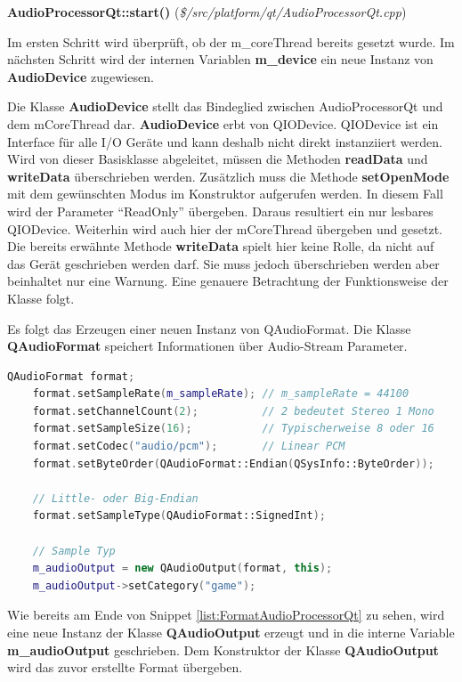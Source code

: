 \documentclass[11pt,a4paper]{scrartcl}
\newcommand{\paratitlecode}[2] {
    \vspace{5mm}
    \large \textbf{#1} \normalsize(\textit{\${#2}})
    \vspace{2mm}\newline
}
\begin{document}
\paratitlecode{AudioProcessorQt::start()}{/src/platform/qt/AudioProcessorQt.cpp}
Im ersten Schritt wird \"uberpr\"uft, ob der m\_coreThread bereits gesetzt wurde. Im n\"achsten Schritt wird der internen Variablen \textbf{m\_device} ein neue Instanz von \textbf{AudioDevice} zugewiesen.

Die Klasse \textbf{AudioDevice} stellt das Bindeglied zwischen AudioProcessorQt und dem mCoreThread dar. \textbf{AudioDevice} erbt von QIODevice. QIODevice ist ein Interface f\"ur alle I/O Ger\"ate und kann deshalb nicht direkt instanziiert werden.
Wird von dieser Basisklasse abgeleitet, m\"ussen die Methoden \textbf{readData} und \textbf{writeData} \"uberschrieben werden. Zus\"atzlich muss die Methode \textbf{setOpenMode} mit dem gew\"unschten Modus im Konstruktor aufgerufen werden. In diesem Fall wird der Parameter \enquote{ReadOnly} \"ubergeben. Daraus resultiert ein nur lesbares QIODevice. Weiterhin wird auch hier der mCoreThread \"ubergeben und gesetzt. Die bereits erw\"ahnte Methode \textbf{writeData} spielt hier keine Rolle, da nicht auf das Ger\"at geschrieben werden darf. Sie muss jedoch \"uberschrieben werden aber beinhaltet nur eine Warnung. Eine genauere Betrachtung der Funktionsweise der Klasse folgt.

Es folgt das Erzeugen einer neuen Instanz von QAudioFormat. Die Klasse \textbf{QAudioFormat} speichert Informationen \"uber Audio-Stream Parameter.

\vspace{5mm}
\begin{lstlisting}[language=C++, caption={Ausschnitt aus AudioProcessorQt::start()}, label={list:FormatAudioProcessorQt}]
    QAudioFormat format;
    format.setSampleRate(m_sampleRate); // m_sampleRate = 44100
    format.setChannelCount(2);			// 2 bedeutet Stereo 1 Mono
    format.setSampleSize(16);			// Typischerweise 8 oder 16
    format.setCodec("audio/pcm");		// Linear PCM
    format.setByteOrder(QAudioFormat::Endian(QSysInfo::ByteOrder));

    // Little- oder Big-Endian
    format.setSampleType(QAudioFormat::SignedInt);

    // Sample Typ
    m_audioOutput = new QAudioOutput(format, this);
    m_audioOutput->setCategory("game");
\end{lstlisting}
  
Wie bereits am Ende von Snippet \ref{list:FormatAudioProcessorQt} zu sehen, wird eine neue Instanz der Klasse \textbf{QAudioOutput} erzeugt und in die interne Variable \textbf{m\_audioOutput} geschrieben. 
Dem Konstruktor der Klasse \textbf{QAudioOutput} wird das zuvor erstellte Format \"ubergeben.
\end{document}
